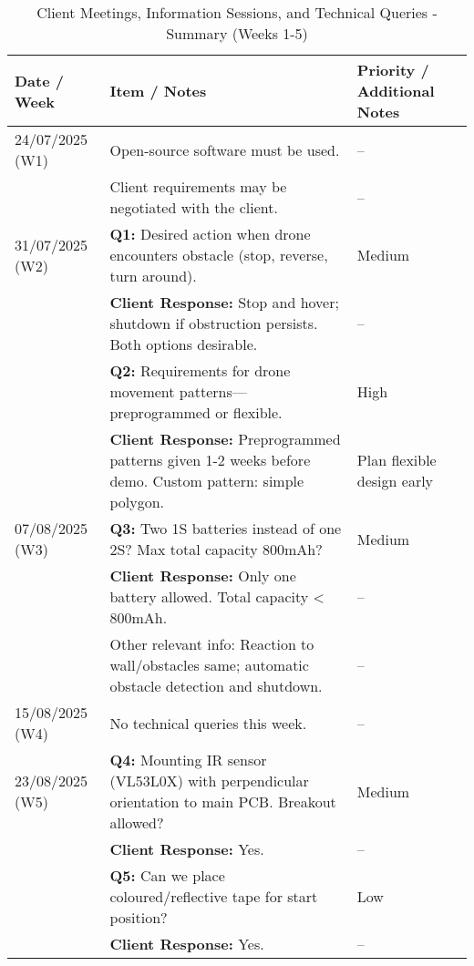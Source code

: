 \begin{table}[H]
\centering
\caption{Client Meetings, Information Sessions, and Technical Queries - Summary (Weeks 1-5)}
\begin{tabular}{|p{2cm}|p{9.5cm}|p{3cm}|}
\hline
\textbf{Date / Week} & \textbf{Item / Notes} & \textbf{Priority / Additional Notes} \\ \hline
24/07/2025 (W1) & Open-source software must be used. & -- \\ \hline
 & Client requirements may be negotiated with the client. & -- \\ \hline
31/07/2025 (W2) & \textbf{Q1:} Desired action when drone encounters obstacle (stop, reverse, turn around). & Medium \\ \hline
 & \textbf{Client Response:} Stop and hover; shutdown if obstruction persists. Both options desirable. & -- \\ \hline
 & \textbf{Q2:} Requirements for drone movement patterns—preprogrammed or flexible. & High \\ \hline
 & \textbf{Client Response:} Preprogrammed patterns given 1-2 weeks before demo. Custom pattern: simple polygon. & Plan flexible design early \\ \hline
07/08/2025 (W3) & \textbf{Q3:} Two 1S batteries instead of one 2S? Max total capacity 800mAh? & Medium \\ \hline
 & \textbf{Client Response:} Only one battery allowed. Total capacity < 800mAh. & -- \\ \hline
 & Other relevant info: Reaction to wall/obstacles same; automatic obstacle detection and shutdown. & -- \\ \hline
15/08/2025 (W4) & No technical queries this week. & -- \\ \hline
23/08/2025 (W5) & \textbf{Q4:} Mounting IR sensor (VL53L0X) with perpendicular orientation to main PCB. Breakout allowed? & Medium \\ \hline
 & \textbf{Client Response:} Yes. & -- \\ \hline
 & \textbf{Q5:} Can we place coloured/reflective tape for start position? & Low \\ \hline
 & \textbf{Client Response:} Yes. & -- \\ \hline
\end{tabular}
\end{table}

